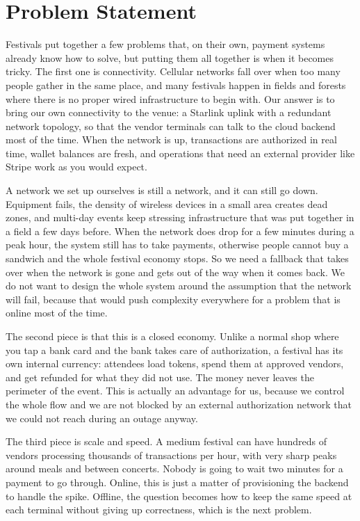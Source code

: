 \section{Problem Statement}
\label{sec:problem-statement}

Festivals put together a few problems that, on their own, payment systems already know how to solve, but putting them all together is when it becomes tricky. The first one is connectivity. Cellular networks fall over when too many people gather in the same place, and many festivals happen in fields and forests where there is no proper wired infrastructure to begin with. Our answer is to bring our own connectivity to the venue: a Starlink uplink with a redundant network topology, so that the vendor terminals can talk to the cloud backend most of the time. When the network is up, transactions are authorized in real time, wallet balances are fresh, and operations that need an external provider like Stripe work as you would expect.

A network we set up ourselves is still a network, and it can still go down. Equipment fails, the density of wireless devices in a small area creates dead zones, and multi-day events keep stressing infrastructure that was put together in a field a few days before. When the network does drop for a few minutes during a peak hour, the system still has to take payments, otherwise people cannot buy a sandwich and the whole festival economy stops. So we need a fallback that takes over when the network is gone and gets out of the way when it comes back. We do not want to design the whole system around the assumption that the network will fail, because that would push complexity everywhere for a problem that is online most of the time.

The second piece is that this is a closed economy. Unlike a normal shop where you tap a bank card and the bank takes care of authorization, a festival has its own internal currency: attendees load tokens, spend them at approved vendors, and get refunded for what they did not use. The money never leaves the perimeter of the event. This is actually an advantage for us, because we control the whole flow and we are not blocked by an external authorization network that we could not reach during an outage anyway.

The third piece is scale and speed. A medium festival can have hundreds of vendors processing thousands of transactions per hour, with very sharp peaks around meals and between concerts. Nobody is going to wait two minutes for a payment to go through. Online, this is just a matter of provisioning the backend to handle the spike. Offline, the question becomes how to keep the same speed at each terminal without giving up correctness, which is the next problem.

